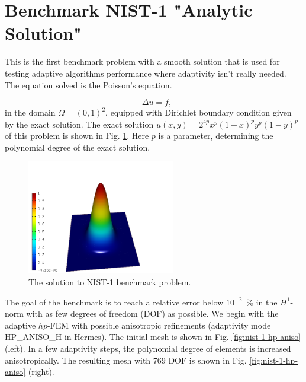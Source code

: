 \section{Benchmark NIST-1 "Analytic Solution"}
\label{sec:bench-1}

This is the first benchmark problem with a smooth solution
that is used for testing adaptive algorithms performance
where adaptivity isn't really needed.
The equation solved is the Poisson's equation.

\begin{equation} \label{poisson}
-\Delta u = f,
\end{equation}
in the domain $\Omega = (0, 1)^2$, equipped with Dirichlet
boundary condition given by the exact solution.
The exact solution $u(x, y) = 2^{4p}x^{p}(1-x)^{p}y^{p}(1-y)^{p}$
of this problem is shown in Fig. \ref{fig:sln-nist01}.
Here $p$ is a parameter, determining the polynomial degree of the exact solution.

\begin{figure}[!ht]
\centering
\includegraphics[height=5cm]{nist/nist-1/solution.png}
\caption{The solution to NIST-1 benchmark problem.}
\label{fig:sln-nist01}
\end{figure}
\noindent
The goal of the benchmark is to reach a relative error below
$10^{-2}$~\% in the $H^1$-norm with as few degrees of freedom (DOF)
as possible.
We begin with the adaptive $hp$-FEM with possible anisotropic refinements (adaptivity mode
HP\_ANISO\_H in {\sc Hermes}). The initial mesh is shown in Fig. \ref{fig:nist-1-hp-aniso} (left).
In a few adaptivity steps, the polynomial degree of elements is increased
anisotropically.
The resulting mesh with 769 DOF is shown in Fig. \ref{fig:nist-1-hp-aniso} (right).

